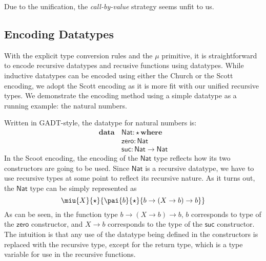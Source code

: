 Due to the unification, the \emph{call-by-value} strategy seems unfit to us. 

\subsection{Encoding Datatypes}


\newcommand{\Nat}{\mathsf{Nat}} \newcommand{\zero}{\mathsf{zero}}
\newcommand{\suc}{\mathsf{suc}} \newcommand{\plus}{\mathsf{plus}}
\newcommand{\List}{\mathsf{List}} \newcommand{\nil}{\mathsf{nil}}
\newcommand{\cons}{\mathsf{cons}}
\newcommand{\length}{\mathsf{length}}
\newcommand{\case}{\mathbf{case}} \newcommand{\of}{\mathbf{of}}
\newcommand{\data}{\mathbf{data}} \newcommand{\where}{\mathbf{where}}
\newcommand{\letbb}{\mathbf{let}} \newcommand{\inb}{\mathbf{in}}

With the explicit type conversion rules and the $\mu$ primitive, it is straightforward to encode recursive datatypes and recusive functions using datatypes. While inductive datatypes can be encoded using either the Church or the Scott encoding, we adopt the Scott encoding as it is more fit with our unified recursive types. We demonstrate the encoding method using a simple datatype as a running example: the natural numbers.

Written in GADT-style, the datatype for natural numbers is:
\begin{align*}
  \data\,&\Nat : \star\,\where \\
         &\zero : \Nat \\
         &\suc : \Nat \rightarrow \Nat
\end{align*}
In the Scoot encoding, the encoding of the $\Nat$ type reflects how its two constructors are going to be used. Since $\Nat$ is a recursive datatype, we have to use recursive types at some point to reflect its recursive nature. As it turns out, the $\Nat$ type can be simply represented as
\[\miu{X}{\star}{\pai{b}{\star}{b \rightarrow (X \rightarrow b) \rightarrow b}}\]
As can be seen, in the function type $b \rightarrow (X \rightarrow b) \rightarrow b$, $b$ corresponds to type of the $\zero$ constructor, and $X \rightarrow b$ corresponds to the type of the $\suc$ constructor. The intuition is that any use of the datatype being defined in the constructors is replaced with the recursive type, except for the return type, which is a type variable for use in the recursive functions.

